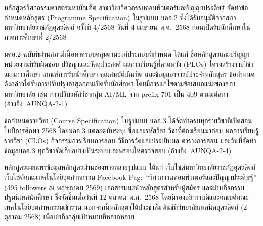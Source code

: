 


หลักสูตรวิศวกรรมศาสตรมหาบัณฑิต สาขาวิชาวิศวกรรมคอมพิวเตอร์และปัญญาประดิษฐ์ จัดทำข้อกำหนดหลักสูตร (Programme Specification) ในรูปแบบ มคอ.2 ซึ่งได้รับอนุมัติจากสภามหาวิทยาลัยราชภัฏอุตรดิตถ์ ครั้งที่ 4/2568 วันที่ 4 เมษายน พ.ศ.~2568 ก่อนเปิดรับนักศึกษาในภาคการศึกษาที่ 2/2568

มคอ.2 ฉบับที่ผ่านสภามีเนื้อหาครอบคลุมตามองค์ประกอบที่กำหนด ได้แก่ ชื่อหลักสูตรและปริญญา หน่วยงานที่รับผิดชอบ ปรัชญาและวัตถุประสงค์ ผลการเรียนรู้ที่คาดหวัง (PLOs) โครงสร้างรายวิชา แผนการศึกษา เกณฑ์การรับนักศึกษา คุณสมบัติบัณฑิต และข้อมูลอาจารย์ประจำหลักสูตร ข้อกำหนดดังกล่าวได้รับการปรับปรุงล่าสุดก่อนเปิดรับนักศึกษา โดยมีการแก้ไขตามข้อเสนอแนะของสภามหาวิทยาลัย เช่น การปรับรหัสวิชากลุ่ม AI/ML จาก prefix 701 เป็น 409 ตามมติสภา (อ้างอิง~\hyperlink{ref:AUNQA-2-1}{AUNQA-2-1})

ข้อกำหนดรายวิชา (Course Specification) ในรูปแบบ มคอ.3 ได้จัดทำครบทุกรายวิชาที่เปิดสอนในปีการศึกษา 2568 โดยมคอ.3 แต่ละฉบับระบุ: ชื่อและรหัสวิชา วิชาที่ต้องเรียนมาก่อน ผลการเรียนรู้รายวิชา (CLOs) กิจกรรมการเรียนการสอน วิธีการวัดและประเมินผล ตารางการสอน และวันที่จัดทำ ข้อมูลมคอ.3 ทุกวิชาจัดเก็บอย่างเป็นระบบและพร้อมให้ตรวจสอบ (อ้างอิง~\hyperlink{ref:AUNQA-2-4}{AUNQA-2-4})

หลักสูตรเผยแพร่ข้อมูลหลักสูตรผ่านช่องทางหลายรูปแบบ ได้แก่ เว็บไซต์มหาวิทยาลัยราชภัฏอุตรดิตถ์ เว็บไซต์คณะเทคโนโลยีอุตสาหกรรม Facebook Page ``วิศวกรรมคอมพิวเตอร์และปัญญาประดิษฐ์'' (495 followers ณ พฤษภาคม 2569) เอกสารแนะนำหลักสูตรสำหรับผู้สมัคร และผ่านกิจกรรมปฐมนิเทศนักศึกษา ซึ่งจัดขึ้นเมื่อวันที่ 12 ตุลาคม พ.ศ.~2568 โดยมีรองอธิการบดีและคณบดีคณะเทคโนโลยีอุตสาหกรรมเข้าร่วม นอกจากนี้หลักสูตรได้ประชาสัมพันธ์ที่วิทยาลัยเทคนิคอุตรดิตถ์ (2 ตุลาคม 2568) เพื่อเข้าถึงกลุ่มเป้าหมายที่หลากหลาย



